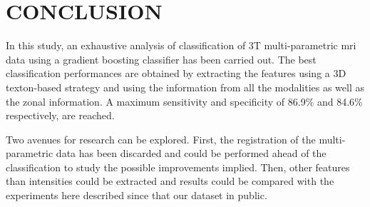 \section{CONCLUSION}\label{sec:conclusion}

In this study, an exhaustive analysis of classification of 3T multi-parametric \ac{mri} data using a gradient boosting classifier has been carried out. The best classification performances are obtained by extracting the features using a 3D texton-based strategy and using the information from all the modalities as well as the zonal information. A maximum sensitivity and specificity of 86.9\% and 84.6\% respectively, are reached.

Two avenues for research can be explored. First, the registration of the multi-parametric data has been discarded and could be performed ahead of the classification to study the possible improvements implied. Then, other features than intensities could be extracted and results could be compared with the experiments here described since that our dataset in public.

